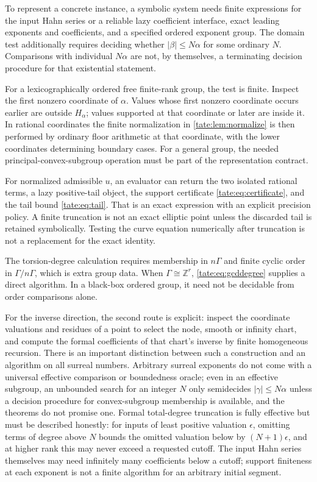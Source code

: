 \documentclass[11pt,letterpaper]{article}
\theoremstyle{definition}
\newcommand{\Z}{\mathbb Z}
\begin{document}
To represent a concrete instance, a symbolic system needs finite
expressions for the input Hahn series or a reliable lazy coefficient
interface, exact leading exponents and coefficients, and a specified
ordered exponent group. The domain test additionally requires deciding
whether $|\beta|\le N\alpha$ for some ordinary $N$. Comparisons with
individual $N\alpha$ are not, by themselves, a terminating decision
procedure for that existential statement.

For a lexicographically ordered free finite-rank group, the test is
finite. Inspect the first nonzero coordinate of $\alpha$. Values whose
first nonzero coordinate occurs earlier are outside $H_\alpha$;
values supported at that coordinate or later are inside it. In rational
coordinates the finite normalization in \cref{tate:lem:normalize} is then
performed by ordinary floor arithmetic at that coordinate, with the
lower coordinates determining boundary cases. For a general group,
the needed principal-convex-subgroup operation must be part of the
representation contract.

For normalized admissible $u$, an evaluator can return the two isolated
rational terms, a lazy positive-tail object, the support certificate
\eqref{tate:eq:certificate}, and the tail bound \eqref{tate:eq:tail}. That is an
exact expression with an explicit precision policy. A finite truncation
is not an exact elliptic point unless the discarded tail is retained
symbolically. Testing the curve equation numerically after truncation
is not a replacement for the exact identity.

The torsion-degree calculation requires membership in $n\Gamma$ and
finite cyclic order in $\Gamma/n\Gamma$, which is extra group data.
When $\Gamma\cong\Z^r$, \eqref{tate:eq:gcddegree} supplies a direct algorithm.
In a black-box ordered group, it need not be decidable from order
comparisons alone.

For the inverse direction, the second route is explicit: inspect the
coordinate valuations and residues of a point to select the node, smooth
or infinity chart, and compute the formal coefficients of that chart's
inverse by finite homogeneous recursion. There is an important distinction
between such a construction and an algorithm on all surreal numbers.
Arbitrary surreal exponents do not come with a universal effective
comparison or boundedness oracle; even in an effective subgroup, an
unbounded search for an integer $N$ only semidecides $|\gamma|\le N\alpha$
unless a decision procedure for convex-subgroup membership is available,
and the theorems do not promise one. Formal total-degree truncation is
fully effective but must be described honestly: for inputs of least
positive valuation $\epsilon$, omitting terms of degree above $N$ bounds
the omitted valuation below by $(N+1)\epsilon$, and at higher rank this may
never exceed a requested cutoff. The input Hahn series themselves may need
infinitely many coefficients below a cutoff; support finiteness at each
exponent is not a finite algorithm for an arbitrary initial segment.
\end{document}
